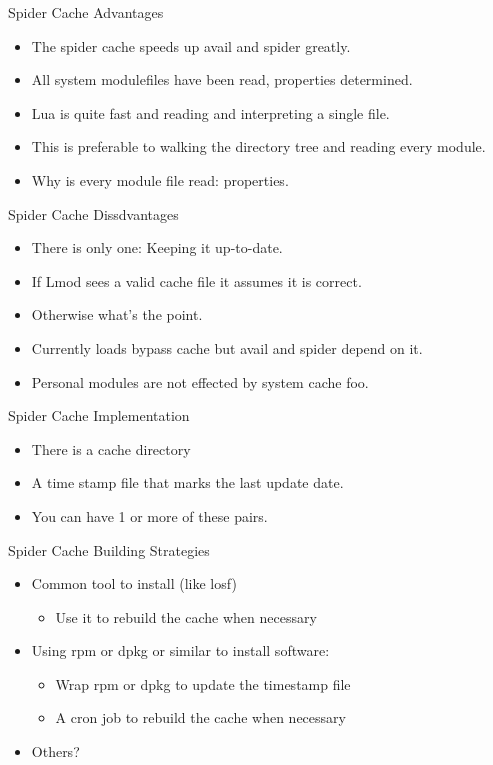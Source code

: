 \documentclass{beamer}
\begin{document}
\begin{frame}{Spider Cache Advantages}
  \begin{itemize}
    \item The spider cache speeds up avail and spider greatly.
    \item All system modulefiles have been read, properties determined.
    \item Lua is quite fast and reading and interpreting a single file.
    \item This is preferable to walking the directory tree and reading
      every module.
    \item Why is every module file read: properties.
  \end{itemize}
\end{frame}

\begin{frame}{Spider Cache Dissdvantages}
  \begin{itemize}
    \item There is only one: Keeping it up-to-date.
    \item If Lmod sees a valid cache file it assumes it is correct.
    \item Otherwise what's the point.
    \item Currently loads bypass cache but avail and spider depend on it.
    \item Personal modules are not effected by system cache foo.
  \end{itemize}
\end{frame}

\begin{frame}{Spider Cache Implementation}
  \begin{itemize}
    \item There is a cache directory
    \item A time stamp file that marks the last update date.
    \item You can have 1 or more of these pairs.
  \end{itemize}
\end{frame}

\begin{frame}{Spider Cache Building Strategies}
  \begin{itemize}
    \item Common tool to install (like losf)
      \begin{itemize}
        \item Use it to rebuild the cache when necessary
      \end{itemize}
    \item Using rpm or dpkg or similar to install software:
      \begin{itemize}
        \item Wrap rpm or dpkg to update the timestamp file
        \item A cron job to rebuild the cache when necessary
      \end{itemize}
    \item Others?
  \end{itemize}
\end{frame}
\end{document}
